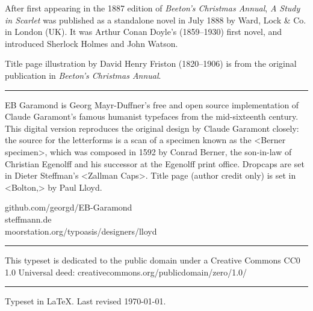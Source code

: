 \documentclass[
paper=5.5in:8.5in,
]{scrbook} %
\begin{document}
\centering
\vfill
\begin{minipage}{\textwidth}
After first appearing in the 1887 edition of \textit{Beeton's Christmas Annual}, \textit{A Study in Scarlet} was published as a standalone novel in July 1888 by Ward, Lock \& Co. in London (UK). It was Arthur Conan Doyle's (1859--1930) first novel, and introduced Sherlock Holmes and John Watson.

Title page illustration by David Henry Friston (1820--1906) is from the original publication in \textit{Beeton's Christmas Annual}.
\end{minipage}
\vfill
\rule{0.5\textwidth}{.4pt}
\vfill
\begin{minipage}{\textwidth}
EB Garamond is Georg Mayr-Duffner's free and open source implementation of Claude Garamont’s famous humanist typefaces from the mid-sixteenth century. This digital version reproduces the original design by Claude Garamont closely: the source for the letterforms is a scan of a specimen known as the <Berner specimen>, which was composed in 1592 by Conrad Berner, the son-in-law of Christian Egenolff and his successor at the Egenolff print office. Dropcaps are set in Dieter Steffman's <Zallman Caps>. Title page (author credit only) is set in <Bolton,> by Paul Lloyd.
\end{minipage}
github.com/georgd/EB-Garamond\\
steffmann.de\\
moorstation.org/typoasis/designers/lloyd
\vfill
\rule{0.5\textwidth}{.4pt}
\vfill
\begin{minipage}{\textwidth}
This typeset is dedicated to the public domain under a Creative Commons CC0 1.0 Universal deed: creativecommons.org/publicdomain/zero/1.0/
\end{minipage}
\vfill
\rule{0.5\textwidth}{.4pt}
\vfill
Typeset in \LaTeX{}. Last revised \today.
\thispagestyle{empty}
\end{document}
